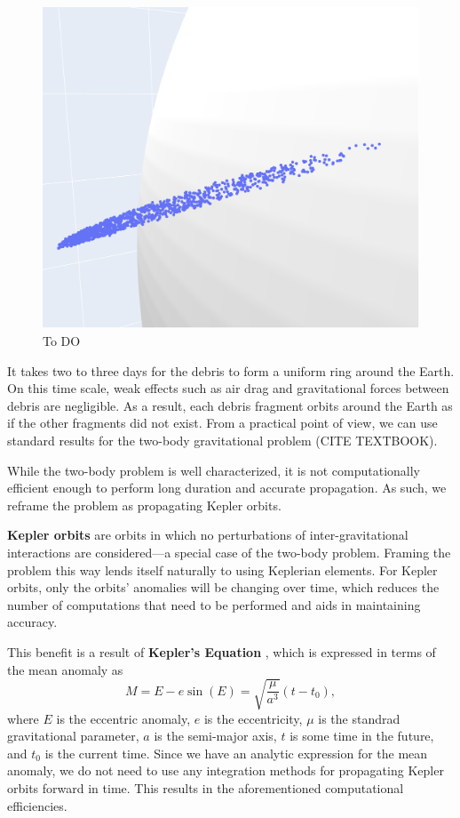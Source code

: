 \documentclass[a4paper, 12pt]{article}
\newcommand{\boldindex}[1]{%
	\textbf{#1}\index{#1}%
}
\begin{document}
\begin{figure}[h]
	\centering
	\includegraphics[scale=0.35]{ellisoid_phase}
	\caption{To DO }
	\label{fig:ellipsoid}
\end{figure}

It takes two to three days for the debris to form a uniform ring around the Earth. On this time scale, weak effects such as air drag and gravitational forces between debris are negligible. As a result, each debris fragment orbits around the Earth as if the other fragments did not exist. From a practical point of view, we can use standard results for the two-body gravitational problem (CITE TEXTBOOK).

While the two-body problem is well characterized, it is not computationally efficient enough to perform long duration and accurate propagation. As such, we reframe the problem as propagating Kepler orbits.

\boldindex{Kepler orbits} are orbits in which no perturbations of inter-gravitational interactions are considered---a special case of the two-body problem. Framing the problem this way lends itself naturally to using Keplerian elements. For Kepler orbits, only the orbits' anomalies will be changing over time, which reduces the number of computations that need to be performed and aids in maintaining accuracy.

This benefit is a result of \boldindex{Kepler's Equation}, which is expressed in terms of the mean anomaly as
\begin{equation}
	M = E - e\sin(E) = \sqrt{\frac{\mu}{a^3}}\left(t - t_0\right),
\end{equation}
where $E$ is the eccentric anomaly, $e$ is the eccentricity, $\mu$ is the standrad gravitational parameter, $a$ is the semi-major axis, $t$ is some time in the future, and $t_0$ is the current time. Since we have an analytic expression for the mean anomaly, we do not need to use any integration methods for propagating Kepler orbits forward in time. This results in the aforementioned computational efficiencies.
\end{document}
